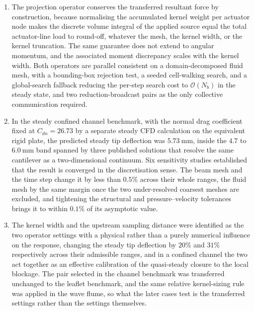 \begin{enumerate}[leftmargin=*]

\item The projection operator conserves the transferred resultant force by construction, because normalising the accumulated kernel weight per actuator node makes the discrete volume integral of the applied source equal the total actuator-line load to round-off, whatever the mesh, the kernel width, or the kernel truncation. The same guarantee does not extend to angular momentum, and the associated moment discrepancy scales with the kernel width. Both operators are parallel consistent on a domain-decomposed fluid mesh, with a bounding-box rejection test, a seeded cell-walking search, and a global-search fallback reducing the per-step search cost to $\mathcal{O}(N_{b})$ in the steady state, and two reduction-broadcast pairs as the only collective communication required.

\item In the steady confined channel benchmark, with the normal drag coefficient fixed at $C_{dn} = 26.73$ by a separate steady CFD calculation on the equivalent rigid plate, the predicted steady tip deflection was $5.73~\mathrm{mm}$, inside the $4.7$ to $6.0~\mathrm{mm}$ band spanned by three published solutions that resolve the same cantilever as a two-dimensional continuum. Six sensitivity studies established that the result is converged in the discretisation sense. The beam mesh and the time step change it by less than $0.5\%$ across their whole ranges, the fluid mesh by the same margin once the two under-resolved coarsest meshes are excluded, and tightening the structural and pressure--velocity tolerances brings it to within $0.1\%$ of its asymptotic value.

\item The kernel width and the upstream sampling distance were identified as the two operator settings with a physical rather than a purely numerical influence on the response, changing the steady tip deflection by $20\%$ and $31\%$ respectively across their admissible ranges, and in a confined channel the two act together as an effective calibration of the quasi-steady closure to the local blockage. The pair selected in the channel benchmark was transferred unchanged to the leaflet benchmark, and the same relative kernel-sizing rule was applied in the wave flume, so what the later cases test is the transferred settings rather than the settings themselves.


\end{enumerate}
